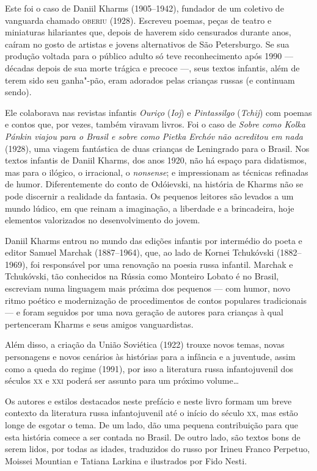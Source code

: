 Este foi o caso de Daniil Kharms (1905--1942), fundador de um coletivo
de vanguarda chamado \textsc{oberiu} (1928). Escreveu poemas, peças de teatro e
miniaturas hilariantes que, depois de haverem sido censurados durante
anos, caíram no gosto de artistas e jovens alternativos de São
Petersburgo. Se sua produção voltada para o público adulto só teve
reconhecimento após 1990 --- décadas depois de sua morte trágica e
precoce ---, seus textos infantis, além de terem sido seu ganha"-pão,
eram adorados pelas crianças russas (e continuam sendo).

Ele colaborava nas revistas infantis \emph{Ouriço} (\emph{Ioj}) e
\emph{Pintassilgo} (\emph{Tchij}) com poemas e contos que, por vezes,
também viravam livros. Foi o caso de \emph{Sobre como Kolka Pánkin
viajou para o Brasil e sobre como Pietka Erchóv não acreditou em nada}
(1928), uma viagem fantástica de duas crianças de Leningrado para o
Brasil. Nos textos infantis de Daniil Kharms, dos anos 1920, não há
espaço para didatismos, mas para o ilógico, o irracional, o
\emph{nonsense}; e impressionam as técnicas refinadas de humor.
Diferentemente do conto de Odóievski, na história de Kharms não se pode
discernir a realidade da fantasia. Os pequenos leitores são levados a um
mundo lúdico, em que reinam a imaginação, a liberdade e a brincadeira,
hoje elementos valorizados no desenvolvimento do jovem.

Daniil Kharms entrou no mundo das edições infantis por intermédio do
poeta e editor Samuel Marchak (1887--1964), que, ao lado de Kornei
Tchukóvski (1882--1969), foi responsável por uma renovação na poesia
russa infantil. Marchak e Tchukóvski, tão conhecidos na Rússia como
Monteiro Lobato é no Brasil, escreviam numa linguagem mais próxima dos
pequenos --- com humor, novo ritmo poético e modernização de
procedimentos de contos populares tradicionais --- e foram seguidos por
uma nova geração de autores para crianças à qual pertenceram Kharms e seus amigos vanguardistas.

Além disso, a criação da União Soviética (1922) trouxe novos temas,
novas personagens e novos cenários às histórias para a infância e a
juventude, assim como a queda do regime (1991), por isso a literatura russa
infantojuvenil dos séculos \textsc{xx} e \textsc{xxi} poderá ser assunto para um próximo
volume\ldots{}

Os autores e estilos destacados neste prefácio e neste livro formam um
breve contexto da literatura russa infantojuvenil até o início do século
\textsc{xx}, mas estão longe de esgotar o tema. De um lado, dão uma pequena
contribuição para que esta história comece a ser contada no Brasil. De
outro lado, são textos bons de serem lidos, por todas as idades,
traduzidos do russo por Irineu Franco Perpetuo, Moissei Mountian e
Tatiana Larkina e ilustrados por Fido Nesti.

